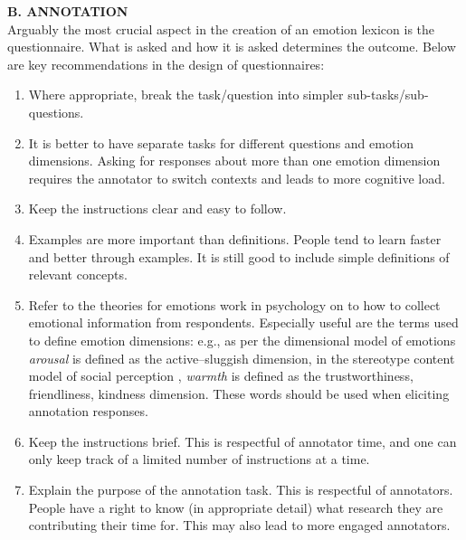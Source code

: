 \documentclass[11pt]{article}
\begin{document}
\noindent \textbf{B. ANNOTATION}\\[-8pt]


 Arguably the most crucial aspect in the creation of an emotion lexicon is the questionnaire. What is asked and how it is asked determines the outcome. Below are key recommendations in the design of questionnaires:\\[-16pt]
\begin{enumerate}[label=\alph*.]
\item Where appropriate, break the task/question into simpler sub-tasks/sub-questions.\\[-18pt]
\item It is better to have separate tasks for different questions and emotion dimensions. Asking for responses about more than one emotion dimension requires the annotator to switch contexts and leads to more cognitive load.\\[-18pt]
\item Keep the instructions clear and easy to follow.\\[-18pt]
\item Examples are more important than definitions. People tend to learn faster and better through examples. It is still good to include simple definitions of relevant concepts.\\[-18pt]
\item Refer to the theories for emotions work in psychology on to how to collect emotional information from respondents. 
Especially useful are the terms used %
to define emotion dimensions:
e.g., as per the dimensional model of emotions \cite{russell1980circumplex} \textit{arousal} is defined as the active--sluggish dimension,
in the stereotype content model of social perception \cite{cuddy2008warmth}, \textit{warmth} is defined as the trustworthiness, friendliness, kindness dimension. These words should be used when eliciting annotation responses.\\[-18pt] %
\item Keep the instructions brief. This is respectful of annotator time, and one can only keep track of a limited number of instructions at a time.\\[-18pt]
\item Explain the purpose of the annotation task. This is respectful of annotators. 
 People have a right to know (in appropriate detail) what research they are contributing their time for. This may also lead to more engaged annotators.  \\[-18pt]

\end{enumerate}
\end{document}
